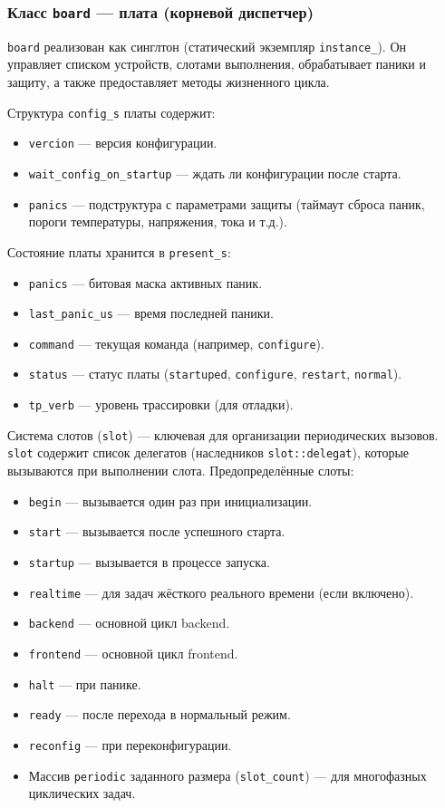 \documentclass[a4paper,12pt]{article}
\begin{document}
\subsubsection{Класс \texttt{board} — плата (корневой диспетчер)}

\texttt{board} реализован как синглтон (статический экземпляр \texttt{instance\_}). Он управляет списком устройств, слотами выполнения, обрабатывает паники и защиту, а также предоставляет методы жизненного цикла.

Структура \texttt{config\_s} платы содержит:
\begin{itemize}
    \item \texttt{vercion} — версия конфигурации.
    \item \texttt{wait\_config\_on\_startup} — ждать ли конфигурации после старта.
    \item \texttt{panics} — подструктура с параметрами защиты (таймаут сброса паник, пороги температуры, напряжения, тока и т.д.).
\end{itemize}

Состояние платы хранится в \texttt{present\_s}:
\begin{itemize}
    \item \texttt{panics} — битовая маска активных паник.
    \item \texttt{last\_panic\_us} — время последней паники.
    \item \texttt{command} — текущая команда (например, \texttt{configure}).
    \item \texttt{status} — статус платы (\texttt{startuped}, \texttt{configure}, \texttt{restart}, \texttt{normal}).
    \item \texttt{tp\_verb} — уровень трассировки (для отладки).
\end{itemize}

Система слотов (\texttt{slot}) — ключевая для организации периодических вызовов. \texttt{slot} содержит список делегатов (наследников \texttt{slot::delegat}), которые вызываются при выполнении слота. Предопределённые слоты:

\begin{itemize}
    \item \texttt{begin} — вызывается один раз при инициализации.
    \item \texttt{start} — вызывается после успешного старта.
    \item \texttt{startup} — вызывается в процессе запуска.
    \item \texttt{realtime} — для задач жёсткого реального времени (если включено).
    \item \texttt{backend} — основной цикл backend.
    \item \texttt{frontend} — основной цикл frontend.
    \item \texttt{halt} — при панике.
    \item \texttt{ready} — после перехода в нормальный режим.
    \item \texttt{reconfig} — при переконфигурации.
    \item Массив \texttt{periodic} заданного размера (\texttt{slot\_count}) — для многофазных циклических задач.
\end{itemize}
\end{document}
